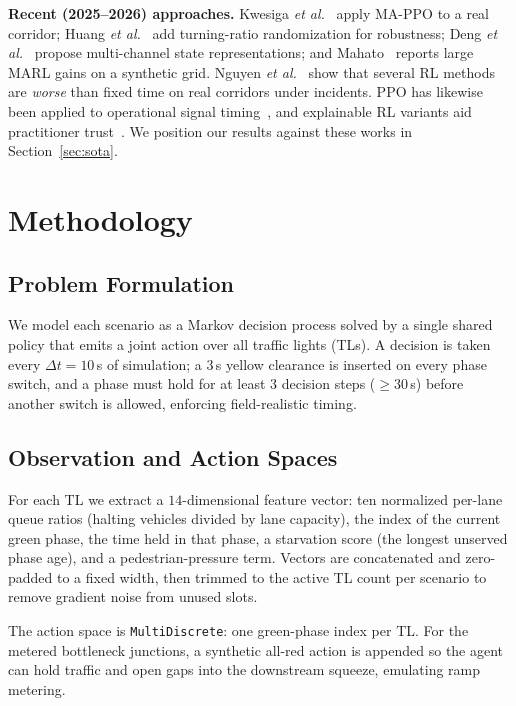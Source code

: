 \documentclass[conference,a4paper]{IEEEtran}
\begin{document}
\textbf{Recent (2025--2026) approaches.}
Kwesiga \emph{et al.}~\cite{kwesiga2025adaptive} apply MA-PPO to a real corridor;
Huang \emph{et al.}~\cite{huang2026robust} add turning-ratio randomization for
robustness; Deng \emph{et al.}~\cite{deng2026adaptive} propose multi-channel state
representations; and Mahato~\cite{mahato2025smart} reports large MARL gains on a
synthetic grid. Nguyen \emph{et al.}~\cite{nguyen2025robustness} show that several
RL methods are \emph{worse} than fixed time on real corridors under incidents.
PPO has likewise been applied to operational signal timing~\cite{huang2023improving},
and explainable RL variants aid practitioner trust~\cite{rizzo2019reinforcement}.
We position our results against these works in Section~\ref{sec:sota}.

\section{Methodology}
\subsection{Problem Formulation}
We model each scenario as a Markov decision process solved by a single shared
policy that emits a joint action over all traffic lights (TLs). A decision is
taken every $\Delta t = 10$\,s of simulation; a $3$\,s yellow clearance is
inserted on every phase switch, and a phase must hold for at least
$3$ decision steps ($\geq 30$\,s) before another switch is allowed, enforcing
field-realistic timing.

\subsection{Observation and Action Spaces}
For each TL we extract a $14$-dimensional feature vector: ten normalized
per-lane queue ratios (halting vehicles divided by lane capacity), the index of
the current green phase, the time held in that phase, a starvation score (the
longest unserved phase age), and a pedestrian-pressure term. Vectors are
concatenated and zero-padded to a fixed width, then trimmed to the active TL
count per scenario to remove gradient noise from unused slots.

The action space is \texttt{MultiDiscrete}: one green-phase index per TL. For the
metered bottleneck junctions, a synthetic all-red action is appended so the agent
can hold traffic and open gaps into the downstream squeeze, emulating ramp
metering.
\end{document}
